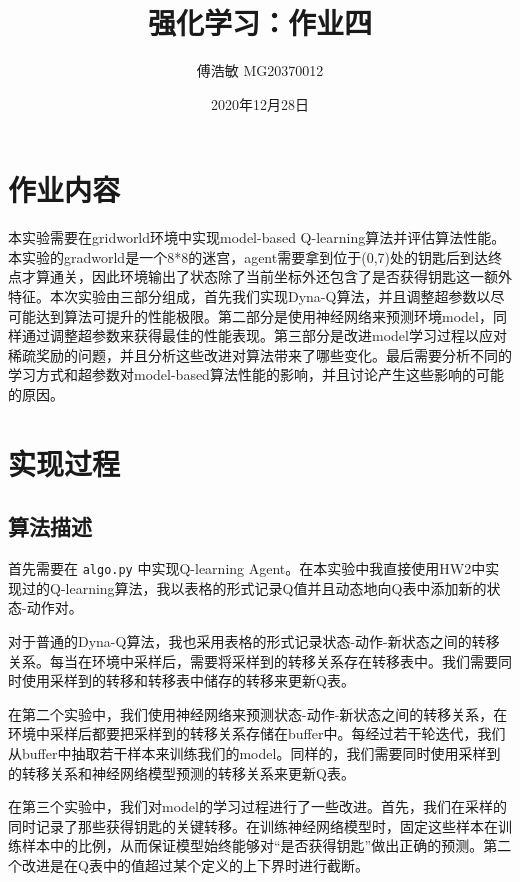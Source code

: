 \documentclass[a4paper,12pt]{article}
\begin{document}
\begin{CJK}{UTF8}{gbsn}

\title{强化学习：作业四}

\author{傅浩敏 MG20370012}

\date{2020年12月28日}

\maketitle

\section{作业内容}
本实验需要在gridworld环境中实现model-based Q-learning算法并评估算法性能。本实验的gradworld是一个8*8的迷宫，agent需要拿到位于(0,7)处的钥匙后到达终点才算通关，因此环境输出了状态除了当前坐标外还包含了是否获得钥匙这一额外特征。本次实验由三部分组成，首先我们实现Dyna-Q算法，并且调整超参数以尽可能达到算法可提升的性能极限。第二部分是使用神经网络来预测环境model，同样通过调整超参数来获得最佳的性能表现。第三部分是改进model学习过程以应对稀疏奖励的问题，并且分析这些改进对算法带来了哪些变化。最后需要分析不同的学习方式和超参数对model-based算法性能的影响，并且讨论产生这些影响的可能的原因。

\section{实现过程}
\subsection{算法描述}
首先需要在 \texttt{algo.py} 中实现Q-learning Agent。在本实验中我直接使用HW2中实现过的Q-learning算法，我以表格的形式记录Q值并且动态地向Q表中添加新的状态-动作对。

对于普通的Dyna-Q算法，我也采用表格的形式记录状态-动作-新状态之间的转移关系。每当在环境中采样后，需要将采样到的转移关系存在转移表中。我们需要同时使用采样到的转移和转移表中储存的转移来更新Q表。

在第二个实验中，我们使用神经网络来预测状态-动作-新状态之间的转移关系，在环境中采样后都要把采样到的转移关系存储在buffer中。每经过若干轮迭代，我们从buffer中抽取若干样本来训练我们的model。同样的，我们需要同时使用采样到的转移关系和神经网络模型预测的转移关系来更新Q表。

在第三个实验中，我们对model的学习过程进行了一些改进。首先，我们在采样的同时记录了那些获得钥匙的关键转移。在训练神经网络模型时，固定这些样本在训练样本中的比例，从而保证模型始终能够对“是否获得钥匙”做出正确的预测。第二个改进是在Q表中的值超过某个定义的上下界时进行截断。

\end{CJK}
\end{document}
